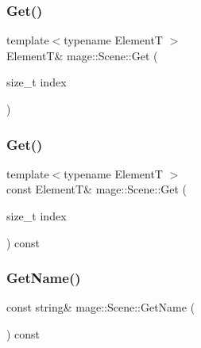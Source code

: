 \hypertarget{classmage_1_1_scene_a51322766fa1e347d71fb8feb09675bf4}{}\label{classmage_1_1_scene_a51322766fa1e347d71fb8feb09675bf4} 
\subsubsection{\texorpdfstring{Get()}{Get()}\hspace{0.1cm}{\footnotesize\ttfamily [1/2]}}
{\footnotesize\ttfamily template$<$typename ElementT $>$ \\
ElementT\& mage\+::\+Scene\+::\+Get (\begin{DoxyParamCaption}\item[{size\+\_\+t}]{index }\end{DoxyParamCaption})\hspace{0.3cm}{\ttfamily [noexcept]}}

\hypertarget{classmage_1_1_scene_a80da83574645fabca847697a7ca38fa7}{}\label{classmage_1_1_scene_a80da83574645fabca847697a7ca38fa7} 
\subsubsection{\texorpdfstring{Get()}{Get()}\hspace{0.1cm}{\footnotesize\ttfamily [2/2]}}
{\footnotesize\ttfamily template$<$typename ElementT $>$ \\
const ElementT\& mage\+::\+Scene\+::\+Get (\begin{DoxyParamCaption}\item[{size\+\_\+t}]{index }\end{DoxyParamCaption}) const\hspace{0.3cm}{\ttfamily [noexcept]}}

\hypertarget{classmage_1_1_scene_a6afd25c30d08eb579eb430af49cf8fc0}{}\label{classmage_1_1_scene_a6afd25c30d08eb579eb430af49cf8fc0} 
\subsubsection{\texorpdfstring{Get\+Name()}{GetName()}}
{\footnotesize\ttfamily const string\& mage\+::\+Scene\+::\+Get\+Name (\begin{DoxyParamCaption}{ }\end{DoxyParamCaption}) const\hspace{0.3cm}{\ttfamily [noexcept]}}

